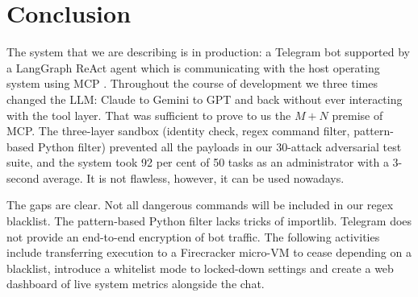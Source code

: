 \documentclass[conference]{IEEEtran}
\begin{document}
\section{Conclusion}
The system that we are describing is in production: a Telegram bot supported by a LangGraph ReAct agent \cite{langgraph2024} which is communicating with the host operating system using MCP \cite{anthropic2024mcp}. Throughout the course of development we three times changed the LLM: Claude to Gemini to GPT and back without ever interacting with the tool layer. That was sufficient to prove to us the $M + N$ premise of MCP. The three-layer sandbox (identity check, regex command filter, pattern-based Python filter) prevented all the payloads in our 30-attack adversarial test suite, and the system took 92 per cent of 50 tasks as an administrator with a 3-second average. It is not flawless, however, it can be used nowadays.

The gaps are clear. Not all dangerous commands will be included in our regex blacklist. The pattern-based Python filter lacks tricks of importlib. Telegram does not provide an end-to-end encryption of bot traffic. The following activities include transferring execution to a Firecracker micro-VM \cite{agache2020firecracker} to cease depending on a blacklist, introduce a whitelist mode to locked-down settings and create a web dashboard of live system metrics alongside the chat.



\end{document}
